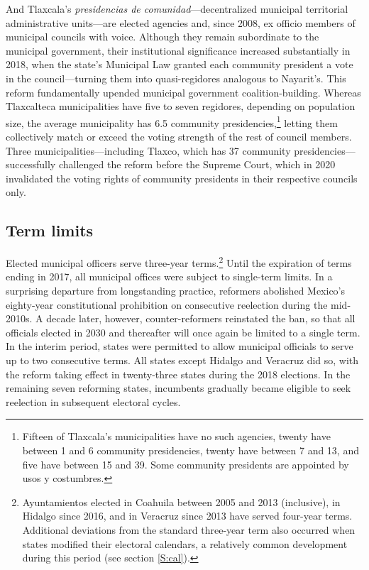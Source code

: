 \documentclass[letter,12pt]{article}
\begin{document}
And Tlaxcala's \emph{presidencias de comunidad}---decentralized municipal territorial administrative units---are elected agencies and, since 2008, ex officio members of municipal councils with voice. Although they remain subordinate to the municipal government, their institutional significance increased substantially in 2018, when the state's Municipal Law granted each community president a vote in the council---turning them into quasi-regidores analogous to Nayarit's. This reform fundamentally upended municipal government coalition-building. Whereas Tlaxcalteca municipalities have five to seven regidores, depending on population size, the average municipality has 6.5 community presidencies,\footnote{Fifteen of Tlaxcala's municipalities have no such agencies, twenty have between 1 and 6 community presidencies, twenty have between 7 and 13, and five have between 15 and 39. Some community presidents are appointed by usos y costumbres.} letting them collectively match or exceed the voting strength of the rest of council members. Three municipalities---including Tlaxco, which has 37 community presidencies---successfully challenged the reform before the Supreme Court, which in 2020 invalidated the voting rights of community presidents in their respective councils only.

\subsection{Term limits}
Elected municipal officers serve three-year terms.\footnote{Ayuntamientos elected in Coahuila between 2005 and 2013 (inclusive), in Hidalgo since 2016, and in Veracruz since 2013 have served four-year terms. Additional deviations from the standard three-year term also occurred when states modified their electoral calendars, a relatively common development during this period (see section \ref{S:cal}).} Until the expiration of terms ending in 2017, all municipal offices were subject to single-term limits. In a surprising departure from longstanding practice, reformers abolished Mexico's eighty-year constitutional prohibition on consecutive reelection during the mid-2010s. A decade later, however, counter-reformers reinstated the ban, so that all officials elected in 2030 and thereafter will once again be limited to a single term. In the interim period, states were permitted to allow municipal officials to serve up to two consecutive terms. All states except Hidalgo and Veracruz did so, with the reform taking effect in twenty-three states during the 2018 elections. In the remaining seven reforming states, incumbents gradually became eligible to seek reelection in subsequent electoral cycles.
\end{document}
